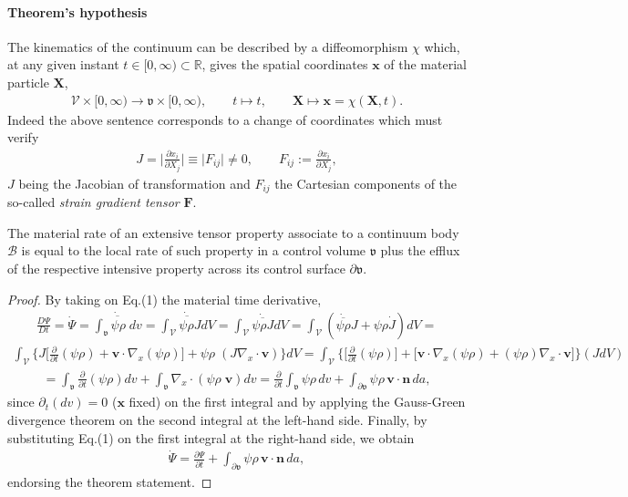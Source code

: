 \paragraph{Theorem's hypothesis}
The kinematics of the continuum can be described by a diffeomorphism $\chi$ which, at any given instant $t\in [0,\infty)\subset\mathbb{R}$, gives the spatial coordinates $\mathbf{x}$ of the material particle $\mathbf{X}$,
\begin{align*}
\mathscr{V}\times[0,\infty)\rightarrow \mathfrak{v}\times[0,\infty), \qquad
t \mapsto t, \qquad \mathbf{X}\mapsto\mathbf{x}=\chi(\mathbf{X},t).
\end{align*}
Indeed the above sentence corresponds to a change of coordinates which must verify
\begin{align*}
J=\bigg\vert\frac{\partial{x}_i}{\partial{X}_j}\bigg\vert\equiv
\big\vert{F_{ij}}\big\vert\neq{0}, \qquad
F_{ij}:=\frac{\partial{x}_i}{\partial{X}_j},
\end{align*}
$J$ being the Jacobian of transformation and $F_{ij}$ the Cartesian components of the so-called {\em strain gradient tensor} $\mathbf{F}$.
\begin{theorem*}
The material rate of an extensive tensor property associate to a continuum body $\mathscr{B}$ is equal to the local rate of such property in a control volume $\mathfrak{v}$ plus the efflux of the respective intensive property across its control surface $\partial\mathfrak{v}$.
\end{theorem*}
\begin{proof}
By taking on Eq.(1) the material time derivative,
\begin{align*}
\frac{D\Psi}{Dt}=\dot{\Psi}=\dot{\overline{\int_{\mathfrak{v}}\psi\rho\;dv}}=
\dot{\overline{\int_{\mathscr{V}}\psi\rho{J}dV}}=
\int_{\mathscr{V}}\dot{\overline{\psi\rho{J}}}dV=
\int_{\mathscr{V}}(\dot{\overline{\psi\rho}}J+\psi\rho\dot{J})dV=
\end{align*}
\begin{align*}
\int_{\mathscr{V}}\Big\{J\Big[\frac{\partial}{\partial{t}}(\psi\rho)+
\mathbf{v}\!\cdot\!\nabla_x(\psi\rho)\Big]+
\psi\rho\;(J\nabla_x\!\cdot\!\mathbf{v})\Big\}dV=
\int_{\mathscr{V}}\Big\{\Big[\frac{\partial}{\partial{t}}(\psi\rho)\Big]
+\big[\mathbf{v}\!\cdot\!\nabla_x(\psi\rho)+
(\psi\rho)\nabla_x\!\cdot\!\mathbf{v}\big]\Big\}(JdV)
\end{align*}
\begin{align*}
=\int_{\mathfrak{v}}\frac{\partial}{\partial{t}}(\psi\rho)dv+
\int_{\mathfrak{v}}\nabla_x\!\cdot\!(\psi\rho\;\mathbf{v})dv=
\frac{\partial}{\partial{t}}\int_{\mathfrak{v}}\psi\rho\,dv+
\int_{\partial\mathfrak{v}}\psi\rho\,\mathbf{v}\!\cdot\!\mathbf{n}\,da,
\end{align*}
since $\partial_t(dv)=0$ ($\mathbf{x}$ fixed) on the first integral and by applying the Gauss-Green divergence theorem on the second integral at the left-hand side. Finally, by substituting Eq.(1) on the first integral at the right-hand side, we obtain
\begin{align}
\dot{\Psi}=\frac{\partial\Psi}{\partial{t}}+
\int_{\partial\mathfrak{v}}\psi\rho\,\mathbf{v}\!\cdot\!\mathbf{n}\,da,
\end{align}
endorsing the theorem statement.
\end{proof}
